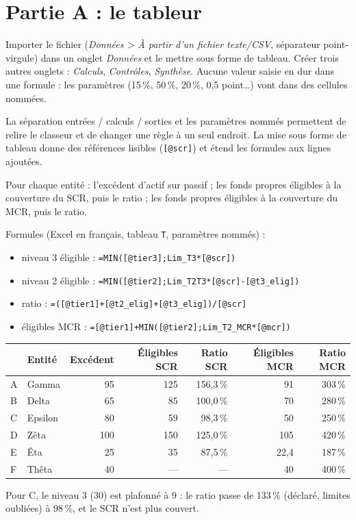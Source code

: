 \documentclass[11pt,a4paper]{article}
\newcommand{\fx}[1]{\texttt{\small #1}}
\begin{document}
\section{Partie A : le tableur}

\begin{exercice}
Importer le fichier (\emph{Données > À partir d'un fichier texte/CSV}, séparateur point-virgule)
dans un onglet \emph{Données} et le mettre sous forme de tableau. Créer trois autres onglets :
\emph{Calculs}, \emph{Contrôles}, \emph{Synthèse}. Aucune valeur saisie en dur dans une formule : les
paramètres (15\,\%, 50\,\%, 20\,\%, 0,5 point…) vont dans des cellules nommées.
\end{exercice}
\begin{corrige}
La séparation entrées / calculs / sorties et les paramètres nommés permettent de relire le classeur
et de changer une règle à un seul endroit. La mise sous forme de tableau donne des références
lisibles (\fx{[@scr]}) et étend les formules aux lignes ajoutées.
\end{corrige}

\begin{exercice}[Recalculer]
Pour chaque entité : l'excédent d'actif sur passif ; les fonds propres éligibles à la couverture
du SCR, puis le ratio ; les fonds propres éligibles à la couverture du MCR, puis le ratio.
\end{exercice}
\begin{corrige}
Formules (Excel en français, tableau \fx{T}, paramètres nommés) :
\begin{itemize}[nosep]
  \item niveau 3 éligible : \fx{=MIN([@tier3];Lim\_T3*[@scr])}
  \item niveau 2 éligible : \fx{=MIN([@tier2];Lim\_T2T3*[@scr]-[@t3\_elig])}
  \item ratio : \fx{=([@tier1]+[@t2\_elig]+[@t3\_elig])/[@scr]}
  \item éligibles MCR : \fx{=[@tier1]+MIN([@tier2];Lim\_T2\_MCR*[@mcr])}
\end{itemize}
\begin{center}
\small
\begin{tabular}{llrrrrr}
\toprule
 & Entité & Excédent & Éligibles SCR & Ratio SCR & Éligibles MCR & Ratio MCR \\
\midrule
A & Gamma   & 95  & 125 & 156,3\,\% & 91   & 303\,\% \\
B & Delta   & 65  & 85  & 100,0\,\% & 70   & 280\,\% \\
C & Epsilon & 80  & 59  & 98,3\,\%  & 50   & 250\,\% \\
D & Zêta    & 100 & 150 & 125,0\,\% & 105  & 420\,\% \\
E & Êta     & 25  & 35  & 87,5\,\%  & 22,4 & 187\,\% \\
F & Thêta   & 40  & --- & ---       & 40   & 400\,\% \\
\bottomrule
\end{tabular}
\end{center}
Pour C, le niveau 3 (30) est plafonné à 9 : le ratio passe de 133\,\% (déclaré, limites oubliées)
à 98\,\%, et le SCR n'est plus couvert.
\end{corrige}
\end{document}
